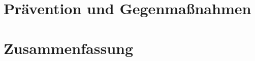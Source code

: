 \documentclass[runningheads,a4paper]{llncs}
\begin{document}
\section{Prävention und Gegenmaßnahmen}


\section{Zusammenfassung}





\newpage


\end{document}
